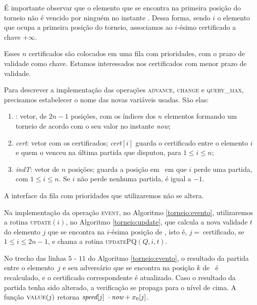 É importante observar que o elemento que se encontra na primeira
posição do torneio não é vencido por ninguém no instante \now. Dessa
forma, sendo $i$ o elemento que ocupa a primeira posição do torneio,
associamos ao $i$-ésimo certificado a chave $+\infty$.



Esses $n$ certificados são colocados em uma fila com prioridades,
com o prazo de validade como chave. Estamos interessados nos
certificados com menor prazo de validade.

Para descrever a implementação das operações \textsc{advance},
\textsc{change} e \textsc{query\_max}, precisamos estabelecer o nome
das novas variáveis usadas. São elas:
\begin{enumerate}
    \item \torneio: vetor, de $2n - 1$ posições, com os índices dos
    $n$ elementos formando um torneio de acordo com o seu valor no
    instante \textit{now};

    \item \textit{cert}: vetor com os certificados;
    \textit{cert}$[i]$ guarda o certificado entre o elemento $i$ e
    quem o venceu na última partida que disputou, para $1 \leq i
    \leq n$;

    \item \textit{indT}: vetor de $n$ posições; \indt[$i$] guarda a
    posição em \torneio~em que $i$ perde uma partida, com $1 \leq i
    \leq n$. Se $i$ não perde nenhuma partida, \indt[$i$] é igual a
    $-1$.
\end{enumerate}

A interface da fila com prioridades que utilizaremos não se altera.

Na implementação da operação \textsc{event}, no Algoritmo
\ref{torneio:evento}, utilizaremos a rotina \textsc{update}$(i)$, no
Algoritmo \ref{torneio:update}, que calcula a nova validade $t$ do
elemento $j$ que se encontra na $i$-ésima posição de \torneio, isto
é, $j =~$\torneio[$i$] certificado, se $1 \leq i \leq 2n - 1$, e
chama a rotina \textsc{updatePQ}$(Q, i, t)$.





No trecho das linhas $5$ - $11$ do Algoritmo \ref{torneio:evento}, o
resultado da partida entre o elemento~$j$ e seu adversário que se
encontra na posição $k$ de \torneio~é recalculado, e o certificado
correspondente é atualizado. Caso o resultado da partida tenha sido
alterado, a verificação se propaga para o nível de cima. A função
$\Call{value}{j}$ retorna ${\textit{speed}[j]~\cdot\textit{now} + x_0[j]}$.

